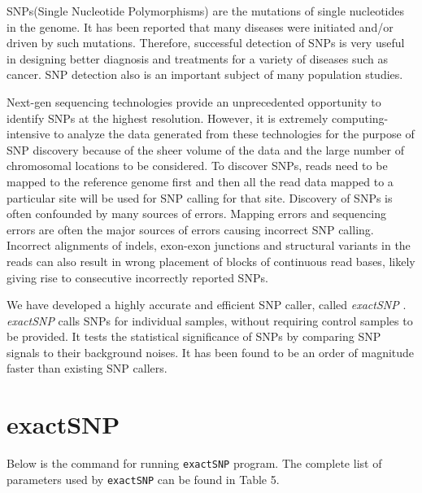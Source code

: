 \documentclass[12pt]{report}
\newcommand{\code}[1]{{\small\texttt{#1}}}
\begin{document}
SNPs(Single Nucleotide Polymorphisms) are the mutations of single nucleotides in the genome.
It has been reported that many diseases were initiated and/or driven by such mutations.
Therefore, successful detection of SNPs is very useful in designing better diagnosis and treatments for a variety of diseases such as cancer.
SNP detection also is an important subject of many population studies.

Next-gen sequencing technologies provide an unprecedented opportunity to identify SNPs at the highest resolution.
However, it is extremely computing-intensive to analyze the data generated from these technologies for the purpose of SNP discovery  because of the sheer volume of the data and the large number of chromosomal locations to be considered.
To discover SNPs, reads need to be mapped to the reference genome first and then all the read data mapped to a particular site will be used for SNP calling for that site.
Discovery of SNPs is often confounded by many sources of errors.
Mapping errors and sequencing errors are often the major sources of errors causing incorrect SNP calling.
Incorrect alignments of indels, exon-exon junctions and structural variants in the reads can also result in wrong placement of blocks of continuous read bases, likely giving rise to consecutive incorrectly reported SNPs.

We have developed a highly accurate and efficient SNP caller, called \emph{exactSNP} \cite{exactSNP}.
\emph{exactSNP} calls SNPs for individual samples, without requiring control samples to be provided.
It tests the statistical significance of SNPs by comparing SNP signals to their background noises.
It has been found to be an order of magnitude faster than existing SNP callers.

\section{exactSNP}

Below is the command for running \code{exactSNP} program.
The complete list of parameters used by \code{exactSNP} can be found in Table 5.\\

\noindent\code{exactSNP [options] -i input -g reference\_genome -o output}\\
\end{document}
